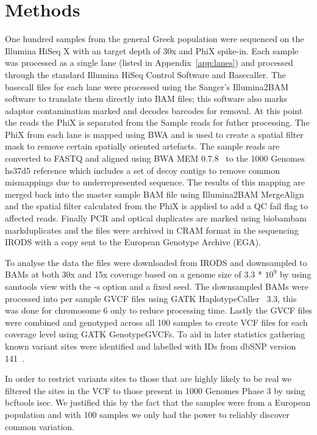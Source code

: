 \documentclass{article}
\begin{document}
  \section{Methods}
  {One hundred samples from the general Greek population were sequenced on the Illumina HiSeq X with an target depth of 30x and PhiX spike-in. Each sample was processed as a single lane (listed in Appendix~\ref{app:lanes}) and processed through the standard Illumina HiSeq Control Software and Basecaller. The basecall files for each lane were processed using the Sanger's Illumina2BAM software to translate them directly into BAM files; this software also marks adaptor contamination marked and decodes barcodes for removal. At this point the reads the PhiX is separated from the Sample reads for futher processing. The PhiX from each lane is mapped using BWA and is used to create a spatial filter mask to remove certain spatially oriented artefacts. The sample reads are converted to FASTQ and aligned using BWA MEM 0.7.8~\cite{bwamem} to the 1000 Genomes hs37d5 reference which includes a set of decoy contigs to remove common mismappings due to underrepresented sequence.  The results of this mapping are merged back into the master sample BAM file using Illumina2BAM MergeAlign and the spatial filter calculated from the PhiX is applied to add a QC fail flag to affected reads. Finally PCR and optical duplicates are marked using biobambam markduplicates and the files were archived in CRAM format in the sequencing IRODS with a copy sent to the European Genotype Archive (EGA).}

  {To analyse the data the files were downloaded from IRODS and downsampled to BAMs at both 30x and 15x coverage based on a genome size of 3.3 *  $10^{9}$ by using samtools view with the -s option and a fixed seed. The downsampled BAMs were processed into per sample GVCF files using GATK HaplotypeCaller~\cite{gatk} 3.3, this was done for chromosome 6 only to reduce processing time. Lastly the GVCF files were combined and genotyped across all 100 samples to create VCF files for each coverage level using GATK GenotypeGVCFs. To aid in later statistics gathering known variant sites were identified and labelled with IDs from dbSNP version 141~\cite{dbsnp}.}

  {In order to restrict variants sites to those that are highly likely to be real we filtered the sites in the VCF to those present in 1000 Genomes Phase 3 by using bcftools isec. We justified this by the fact that the samples were from a European population and with 100 samples we only had the power to reliably discover common variation.}
\end{document}
